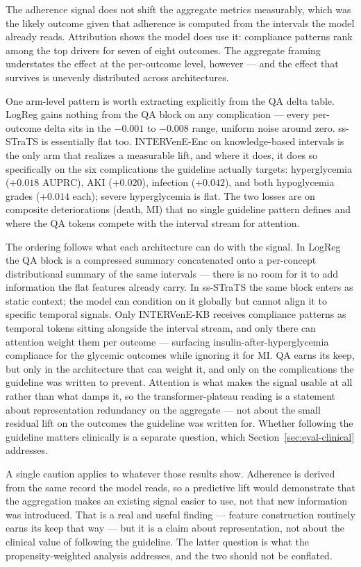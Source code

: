 The adherence signal does not shift the aggregate metrics measurably, which was the likely outcome given that adherence is computed from the intervals the model already reads. Attribution shows the model does use it: compliance patterns rank among the top drivers for seven of eight outcomes. The aggregate framing understates the effect at the per-outcome level, however --- and the effect that survives is unevenly distributed across architectures.

One arm-level pattern is worth extracting explicitly from the QA delta table. LogReg gains nothing from the QA block on any complication --- every per-outcome delta sits in the $-0.001$ to $-0.008$ range, uniform noise around zero. ss-STraTS is essentially flat too. INTERVenE-Enc on knowledge-based intervals is the only arm that realizes a measurable lift, and where it does, it does so specifically on the six complications the guideline actually targets: hyperglycemia ($+0.018$ AUPRC), AKI ($+0.020$), infection ($+0.042$), and both hypoglycemia grades ($+0.014$ each); severe hyperglycemia is flat. The two losses are on composite deteriorations (death, MI) that no single guideline pattern defines and where the QA tokens compete with the interval stream for attention.

The ordering follows what each architecture can do with the signal. In LogReg the QA block is a compressed summary concatenated onto a per-concept distributional summary of the same intervals --- there is no room for it to add information the flat features already carry. In ss-STraTS the same block enters as static context; the model can condition on it globally but cannot align it to specific temporal signals. Only INTERVenE-KB receives compliance patterns as temporal tokens sitting alongside the interval stream, and only there can attention weight them per outcome --- surfacing insulin-after-hyperglycemia compliance for the glycemic outcomes while ignoring it for MI. QA earns its keep, but only in the architecture that can weight it, and only on the complications the guideline was written to prevent. Attention is what makes the signal usable at all rather than what damps it, so the transformer-plateau reading is a statement about representation redundancy on the aggregate --- not about the small residual lift on the outcomes the guideline was written for. Whether following the guideline matters clinically is a separate question, which Section~\ref{sec:eval-clinical} addresses.

A single caution applies to whatever those results show. Adherence is derived from the same record the model reads, so a predictive lift would demonstrate that the aggregation makes an existing signal easier to use, not that new information was introduced. That is a real and useful finding --- feature construction routinely earns its keep that way --- but it is a claim about representation, not about the clinical value of following the guideline. The latter question is what the propensity-weighted analysis addresses, and the two should not be conflated.

